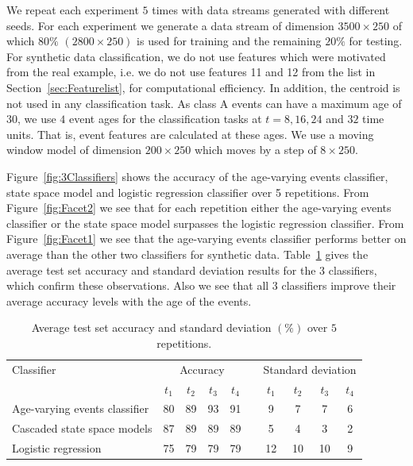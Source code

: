 \documentclass[a4paper,11pt]{article}
\begin{document}
We repeat each experiment $5$ times with data streams generated with different seeds. For each experiment we generate a data stream of dimension $3500 \times 250$ of which $80\%$ $(2800 \times 250)$ is used for training and the remaining $20\%$ for testing. For synthetic data classification, we do not use features which were motivated from the real example, i.e. we do not use features 11 and 12 from the list in Section~\ref{sec:Featurelist}, for computational efficiency. In addition, the centroid is not used in any classification task. As class A events can have a maximum age of $30$, we use $4$ event ages for the classification tasks at $t = 8, 16, 24$ and $32$ time units. That is, event features are calculated at these ages. We use a moving window model of dimension $200 \times 250$ which moves by a step of $8 \times 250$.

Figure~\ref{fig:3Classifiers} shows the accuracy of the age-varying events classifier, state space model and logistic regression classifier over 5 repetitions.  From Figure~\ref{fig:Facet2} we see that for each repetition either the age-varying events classifier or the state space model surpasses the logistic regression classifier. From Figure~\ref{fig:Facet1} we see that the age-varying events classifier performs better on average than the other two classifiers for synthetic data. Table~\ref{tab:Results_Synthetic} gives the average test set accuracy and standard deviation results for the 3 classifiers, which confirm these observations. Also we see that all 3 classifiers improve their average accuracy levels with the age of the events.

\begin{table}[!ht]
  \centering
  \begin{tabular}{lccccccccc}
    \toprule
    Classifier                   & \multicolumn{4}{c}{Accuracy} & & \multicolumn{4}{c}{Standard deviation} \\
    \cmidrule{2-5} \cmidrule{7-10}
                                 & $t_1$ & $t_2$ & $t_3$ & $t_4$   & & $t_1$ & $t_2$ & $t_3$ & $t_4$\\
    \midrule
    Age-varying events classifier & 80    & 89    & 93    & 91  &  & 9  & 7  &  7  & 6 \\
    Cascaded state space models  & 87    & 89    & 89    & 89   & & 5  & 4  &  3  & 2\\
    Logistic regression          & 75    & 79    & 79    & 79   & & 12  & 10 & 10 & 9 \\
    \bottomrule
  \end{tabular}
    \caption{Average test set accuracy and standard deviation $(\%)$ over $5$ repetitions.}\label{tab:Results_Synthetic}
\end{table}
\end{document}
